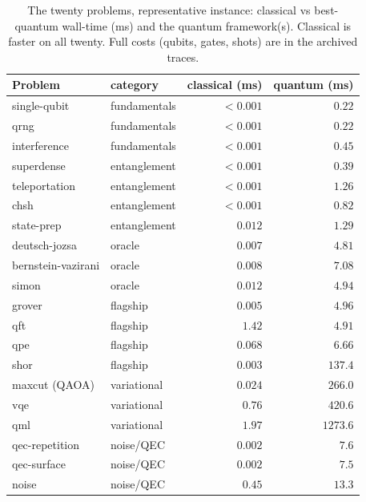 \documentclass[journal]{IEEEtran}
\begin{document}
\begin{table}[!t]
\centering
\caption{The twenty problems, representative instance: classical vs best-quantum wall-time (ms) and the quantum
framework(s). Classical is faster on all twenty. Full costs (qubits, gates, shots) are in the archived traces.}
\label{tab:cases}
\scriptsize
\begin{tabular}{@{}l l r r@{}}
\toprule
Problem & category & classical (ms) & quantum (ms) \\
\midrule
single-qubit        & fundamentals   & $<0.001$ & $0.22$ \\
qrng                & fundamentals   & $<0.001$ & $0.22$ \\
interference        & fundamentals   & $<0.001$ & $0.45$ \\
superdense          & entanglement   & $<0.001$ & $0.39$ \\
teleportation       & entanglement   & $<0.001$ & $1.26$ \\
chsh                & entanglement   & $<0.001$ & $0.82$ \\
state-prep          & entanglement   & $0.012$ & $1.29$ \\
deutsch-jozsa       & oracle         & $0.007$ & $4.81$ \\
bernstein-vazirani  & oracle         & $0.008$ & $7.08$ \\
simon               & oracle         & $0.012$ & $4.94$ \\
grover              & flagship       & $0.005$ & $4.96$ \\
qft                 & flagship       & $1.42$ & $4.91$ \\
qpe                 & flagship       & $0.068$ & $6.66$ \\
shor                & flagship       & $0.003$ & $137.4$ \\
maxcut (QAOA)       & variational    & $0.024$ & $266.0$ \\
vqe                 & variational    & $0.76$ & $420.6$ \\
qml                 & variational    & $1.97$ & $1273.6$ \\
qec-repetition      & noise/QEC      & $0.002$ & $7.6$ \\
qec-surface         & noise/QEC      & $0.002$ & $7.5$ \\
noise               & noise/QEC      & $0.45$ & $13.3$ \\
\bottomrule
\end{tabular}
\end{table}
\end{document}
